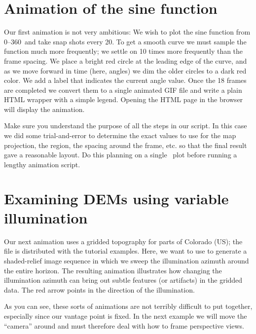 \section{Animation of the sine function}

Our first animation is not very ambitious: We wish to plot the sine
function from 0--360\DS\ and take snap shots every 20\DS.  To get a
smooth curve we must sample the function much more frequently; we
settle on 10 times more frequently than the frame spacing.  We place
a bright red circle at the leading edge of the curve, and as we move
forward in time (here, angles) we dim the older circles to a dark red
color.  We add a label that indicates the current angle value.  Once
the 18 frames are completed we convert them to a single animated GIF file
and write a plain HTML wrapper with a simple legend.  Opening the HTML
page  in the browser will display the animation.


Make sure you understand the purpose of all the steps in our script.
In this case we did some trial-and-error to determine the exact values
to use for the map projection, the region, the spacing around the frame,
etc. so that the final result gave a reasonable layout.  Do this planning
on a single \PS\ plot before running a lengthy animation script.



\section{Examining DEMs using variable illumination}

Our next animation uses a gridded topography for parts of Colorado (US);
the file is distributed with the tutorial examples.  Here, we want to
use  to generate a shaded-relief image sequence in
which we sweep the illumination azimuth around the entire horizon.  The
resulting animation illustrates how changing the illumination azimuth
can bring out subtle features (or artifacts) in the gridded data.  The
red arrow points in the direction of the illumination.


As you can see, these sorts of animations are not terribly difficult to
put together, especially since our vantage point is fixed.  In the next
example we will move the ``camera'' around and must therefore deal with
how to frame perspective views.

